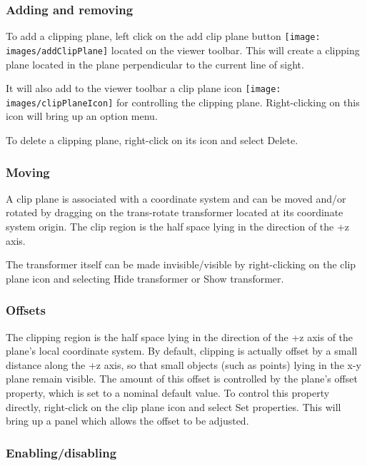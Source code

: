 \documentclass{article}
\begin{document}
\subsubsection{Adding and removing}

To add a clipping plane, left click on the {\sf add clip plane}
button \texttt{[image: images/addClipPlane]} located on the
viewer toolbar. This will create a clipping plane located in the plane
perpendicular to the current line of sight.

It will also add to the viewer toolbar a {\sf clip plane} icon
\texttt{[image: images/clipPlaneIcon]} for controlling the
clipping plane. Right-clicking on this icon will bring up an option
menu.

To delete a clipping plane, right-click on its icon and
select {\sf Delete}.

\subsubsection{Moving}

A clip plane is associated with a coordinate system and can be moved
and/or rotated by dragging on the trans-rotate transformer located at
its coordinate system origin. The clip region is the half space lying
in the direction of the +z axis.

The transformer itself can be made invisible/visible by right-clicking
on the clip plane icon and selecting {\sf Hide transformer} or {\sf Show
transformer}.

\subsubsection{Offsets}

The clipping region is the half space lying in the direction of the +z
axis of the plane's local coordinate system. By default, clipping is
actually offset by a small distance along the +z axis, so that small
objects (such as points) lying in the x-y plane remain
visible. The amount of this offset is controlled by the plane's
{\sf offset} property, which is set to a nominal default value. To control
this property directly, right-click on the clip plane icon and select
{\sf Set properties}. This will bring up a panel which allows the offset
to be adjusted.

\subsubsection{Enabling/disabling}
\end{document}
